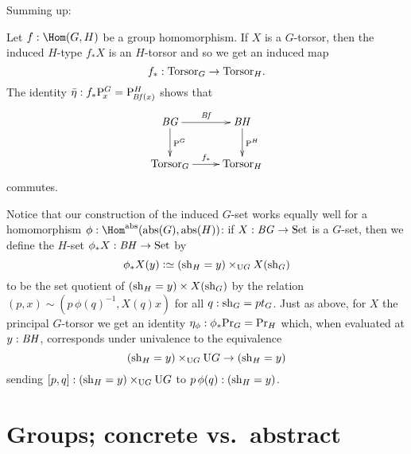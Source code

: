 Summing up:
\begin{lemma}
  \label{lem:inducedtorsor}
   Let $f:\Hom(G,H)$ be a group homomorphism.
   If $X$ is a $G$-torsor, then the induced $H$-type $f_*X$ is an $H$-torsor and so we get an induced map
   $$f_*:\mathrm{Torsor}_G\to\mathrm{Torsor}_H.$$
   The identity
$\bar{\eta}:f_*\mathrm{P}_{\!x}^G=\mathrm{P}_{\!\mathit{B}\mathit{f}(x)}^H$
shows that
$$\xymatrix{\BG\ar[r]^{\Bf}\ar[d]^{\pathsp{}^G}&\BH\ar[d]^{\pathsp{}^H}\\
\typetorsor_G\ar[r]^{f_*}&\typetorsor_H}$$
commutes.
\end{lemma}
\begin{remark}
  \label{rem:inducedGsetfromabstracthomomorphisms}
  Notice that our construction of the induced $G$-set works equally well for a homomorphism $\phi:\Hom^\abstr(\abstr(G),\abstr(H))$:
  if $X:\mathit{B}\mathit{G}\to\mathrm{Set}$ is a $G$-set, then we define the $H$-set $\phi_*X:\mathit{B}\mathit{H}\to\mathrm{Set}$ by
  $$\phi_*X(y)\defequi(\shape_H=y)\times_{\USym G}X(\shape_G)$$
  to be the set quotient of $(\mathrm{sh}_H=y)\times X(\mathrm{sh}_G)$ by the relation $(p,x)\sim(p\, \phi(q)^{-1},X(q)x)$ for all $q:\mathrm{sh}_G=pt_G$.
  Just as above, for $X$ the principal $G$-torsor we get an identity  $\eta_\phi:\phi_*\mathrm{Pr}_{{G}}=\mathrm{Pr}_{{H}}$ which, when evaluated at $y:\mathit{B}\mathit{H}$, corresponds under univalence to the equivalence
$$(\mathrm{sh}_H=y)\times_{\mathrm{U} G}\mathrm{U} G\to (\mathrm{sh}_H=y)$$
sending $[p,q]:(\mathrm{sh}_H=y)\times_{\mathrm{U} G}\mathrm{U} G$ to $p\,\phi(q):(\mathrm{sh}_H=y)$.
\end{remark}


\section{Groups; concrete vs.~abstract%
}
\label{sec:Gsetforabstract}

